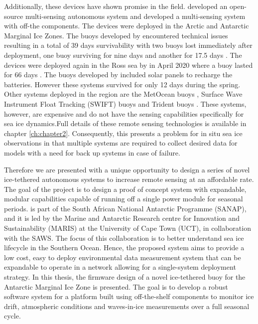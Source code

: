 Additionally, these devices have shown promise in the field. \textcite{rabault2019open} developed an open-source multi-sensing autonomous system and \textcite{kohout2015device} developed a multi-sensing system with off-the components. The devices were deployed in the Arctic and Antarctic Marginal Ice Zones. The buoys developed by \textcite{kohout2015device} encountered technical issues resulting in a total of 39 days survivability with two buoys lost immediately after deployment, one buoy surviving for nine days and another for 17.5 days \cite{kohout2015device}. The devices were deployed again in the Ross sea by \textcite{kohout_smith_roach_williams_montiel_williams_2020} in April 2020 where a buoy lasted for 66 days \cite{kohout_smith_roach_williams_montiel_williams_2020}. The buoys developed by \textcite{rabault2019open}  included solar panels to recharge the batteries. However these systems survived for only 12 days during the spring.  Other systems deployed in the region are the MetOcean buoys \cite{uptempo}, Surface Wave Instrument Float Tracking (SWIFT) \cite{thomson2012wave} buoys and Trident buoys \cite{trident}. These systems, however, are expensive and do not have the sensing capabilities specifically for sea ice dynamics.Full details of these remote sensing technologies is available in chapter \ref{ch:chapter2}. Consequently, this presents a problem for in situ sea ice observations in that multiple systems are required to collect desired data for models with a need for back up systems in case of failure. 

Therefore we are presented with a unique opportunity to design a series of novel ice-tethered autonomous systems to increase remote sensing at an affordable rate. The goal of the project is to design a proof of concept system with expandable, modular capabilities capable of running off a single power module for seasonal periods. is part of the South African National Antarctic Programme (SANAP), and it is led by the Marine and Antarctic Research centre for Innovation and Sustainability (MARIS) at the University of Cape Town (UCT), in collaboration with the SAWS. The focus of this collaboration is to better understand sea ice lifecycle in the Southern Ocean. Hence, the proposed system aims to provide a low cost, easy to deploy environmental data measurement system that can be expandable to operate in a network allowing for a single-system deployment strategy. In this thesis, the firmware design of a novel ice-tethered buoy for the Antarctic Marginal Ice Zone is presented. The goal is to develop a robust software system  for a platform built using off-the-shelf components to monitor ice drift, atmospheric conditions and waves-in-ice measurements over a full seasonal cycle.

